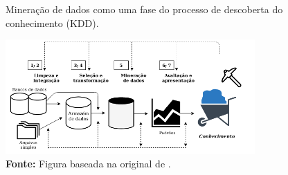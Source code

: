 \vspace{-0.5cm}
\begin{figure}[h]
    \centering
    \caption{Mineração de dados como uma fase do processo de descoberta do conhecimento (KDD).}
    \begin{center}
        \includegraphics[width=0.85\textwidth]{img/based-on-figure-1-4-han-2011.png}
    \end{center}
    \vspace{-0.0cm}
    \caption{\footnotesize \textbf{Fonte:} Figura baseada na original de \cite[p.~7]{Han:2011:DMC:1972541}.}
    \label{fig:diagrama-mineração-texto-han}
\end{figure}